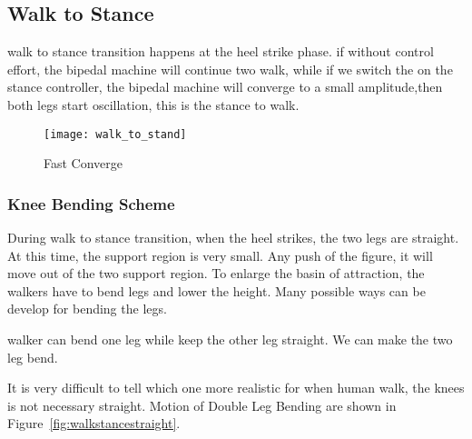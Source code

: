 \subsection{Walk to Stance}
walk to stance transition happens at the heel strike phase.
if without control effort, the bipedal machine will continue two walk, while if we switch the on the stance controller,
the bipedal machine will converge to a small amplitude,then both legs start oscillation, this is the stance to walk.

\begin{figure}[!htbp]
  \begin{center}
    \texttt{[image: walk\_to\_stand]}
    \caption{Fast Converge}
    \label{fig:walksstance}
	\end{center}
\end{figure}







\subsubsection*{Knee Bending Scheme}
During walk to stance transition, when the heel strikes, the two legs are straight. 
At this time, the support region is very small.
Any push of the figure, it will move out of the two support region.
To enlarge the basin of attraction, the walkers have to bend legs and lower the height.
Many possible ways can be develop for bending the legs.


\begin{itemize}
		walker can bend one leg while keep the other leg straight.
		We can make the two leg bend.
\end{itemize}

It is very difficult to tell which one more realistic for when human walk, the knees is not necessary straight.
Motion of Double Leg Bending  are shown in Figure~\ref{fig:walkstancestraight}.

